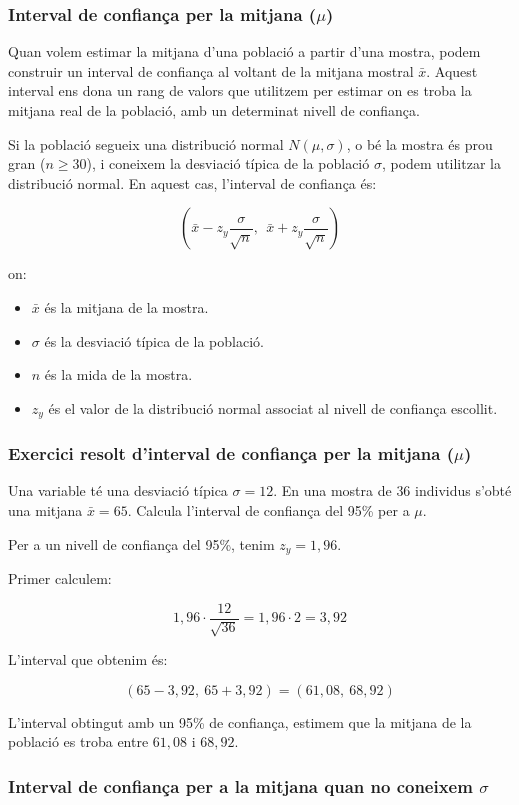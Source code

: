 \subsubsection{Interval de confiança per la mitjana ($\mu$)}
Quan volem estimar la mitjana d'una població a partir d'una mostra, podem construir un interval de confiança al voltant de la mitjana mostral \(\bar{x}\). Aquest interval ens dona un rang de valors que utilitzem per estimar on es troba la mitjana real de la població, amb un determinat nivell de confiança.

Si la població segueix una distribució normal $N(\mu,\sigma)$, o bé la mostra és prou gran ($n \geq 30$), i coneixem la desviació típica de la població $\sigma$, podem utilitzar la distribució normal. En aquest cas, l'interval de confiança és:

$$\left(\bar{x}-z_y\frac{\sigma}{\sqrt{n}},\ \ \bar{x}+z_y\frac{\sigma}{\sqrt{n}}\right)$$

on:
\begin{itemize}
\item $\bar{x}$ és la mitjana de la mostra.
\item $\sigma$ és la desviació típica de la població.
\item $n$ és la mida de la mostra.
\item $z_y$ és el valor de la distribució normal associat al nivell de confiança escollit.
\end{itemize}

\subsubsection{Exercici resolt d'interval de confiança per la mitjana ($\mu$)}
Una variable té una desviació típica $\sigma=12$. En una mostra de $36$ individus s'obté una mitjana $\bar{x}=65$. Calcula l'interval de confiança del 95\% per a $\mu$.

Per a un nivell de confiança del 95\%, tenim $z_y=1{,}96$.

Primer calculem:

$$1{,}96\cdot\frac{12}{\sqrt{36}} = 1{,}96\cdot2 = 3{,}92$$

L'interval que obtenim és:

$$(65-3{,}92,\ 65+3{,}92) = (61{,}08,\ 68{,}92)$$

L'interval obtingut amb un 95\% de confiança, estimem que la mitjana de la població es troba entre $61{,}08$ i $68{,}92$.

\subsubsection{Interval de confiança per a la mitjana quan no coneixem $\sigma$}

